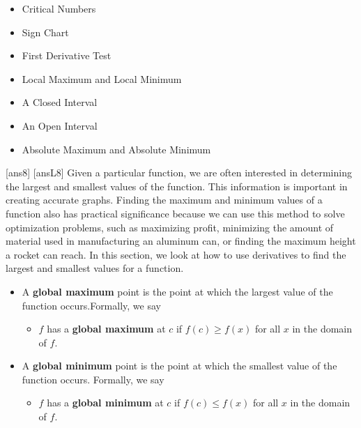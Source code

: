 \begin{framed}
\begin{multicols}{2}
\begin{itemize}
    \item Critical Numbers
    \item Sign Chart
    \item First Derivative Test
    \item Local Maximum and Local Minimum
    \item A Closed Interval
    \item An Open Interval
    \item Absolute Maximum and Absolute Minimum
\end{itemize}
\end{multicols}
\end{framed}

\newpage
[ans8]
[ansL8]
\noindent Given a particular function, we are often interested in determining the largest and smallest values of the function. This information is important in creating accurate graphs. Finding the maximum and minimum values of a function also has practical significance because we can use this method to solve optimization problems, such as maximizing profit, minimizing the amount of material used in manufacturing an aluminum can, or finding the maximum height a rocket can reach. In this section, we look at how to use derivatives to find the largest and smallest values for a function.\\


\begin{tcolorbox}[title = {Global Extreme Points }]
\begin{itemize}[leftmargin=*]
\item A \textbf{global maximum} point is the point at which the largest value of the function occurs.Formally, we say
    \begin{itemize}
        \item $f$ has a \textbf{global maximum} at $c$ if $f(c)\ge f(x)$ for all $x$ in the domain of $f$.
    \end{itemize}
\item A \textbf{global minimum} point is the point at which the smallest value of the function occurs. Formally, we say
    \begin{itemize}
        \item $f$ has a \textbf{global minimum} at $c$ if $f(c)\le f(x)$ for all $x$ in the domain of $f$.
    \end{itemize}
\end{itemize}
\end{tcolorbox}
\vspace{-0.5cm}

